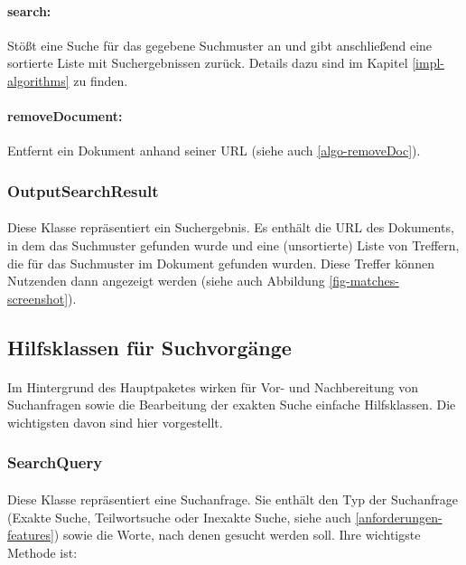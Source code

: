 \paragraph{search:} Stößt eine Suche für das gegebene Suchmuster an und gibt anschließend eine sortierte Liste mit Suchergebnissen zurück. Details dazu sind im Kapitel \ref{impl-algorithms} zu finden.

\paragraph{removeDocument:} Entfernt ein Dokument anhand seiner URL (siehe auch \ref{algo-removeDoc}).

\subsubsection{OutputSearchResult}

\paragraph{} Diese Klasse repräsentiert ein Suchergebnis. Es enthält die URL des Dokuments, in dem das Suchmuster gefunden wurde und eine (unsortierte) Liste von Treffern, die für das Suchmuster im Dokument gefunden wurden. Diese Treffer können Nutzenden dann angezeigt werden (siehe auch Abbildung \ref{fig-matches-screenshot}).

\newpage

\subsection{Hilfsklassen für Suchvorgänge}
\label{arch-helper}

\paragraph{} Im Hintergrund des Hauptpaketes wirken für Vor- und Nachbereitung von Suchanfragen sowie die Bearbeitung der exakten Suche einfache Hilfsklassen. Die wichtigsten davon sind hier vorgestellt.

\subsubsection{SearchQuery}

\paragraph{} Diese Klasse repräsentiert eine Suchanfrage. Sie enthält den Typ der Suchanfrage (Exakte Suche, Teilwortsuche oder Inexakte Suche, siehe auch \ref{anforderungen-features}) sowie die Worte, nach denen gesucht werden soll. Ihre wichtigste Methode ist:

